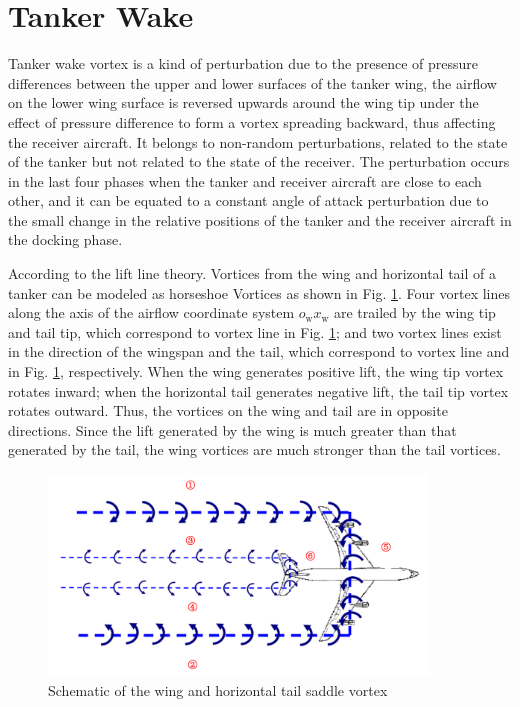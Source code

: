 \section{Tanker Wake}
Tanker wake vortex is a kind of perturbation due to the presence of pressure differences between the upper and lower surfaces of the tanker wing, the airflow on the lower wing surface is reversed upwards around the wing tip under the effect of pressure difference to form a vortex spreading backward, thus affecting the receiver aircraft. It belongs to  non-random perturbations, related to the state of the tanker but not related to the state of the receiver. The perturbation occurs in the last four phases when the tanker and receiver aircraft are close to each other, and it can be equated to a constant angle of attack perturbation due to the small change in the relative positions of the tanker and the receiver aircraft in the docking phase.

According to the lift line theory\cite{pamadi2004performance}. Vortices from the wing and horizontal tail of a tanker can be modeled as horseshoe Vortices as shown in Fig. \ref{fig2}. Four vortex lines along the axis of the airflow coordinate system $o_{\mathrm{w}}x_{\mathrm{w}}$ are trailed by the wing tip and tail tip, which correspond to vortex line  in Fig. \ref{fig2}; and two vortex lines exist in the direction of the wingspan and the tail, which correspond to vortex line  and  in Fig. \ref{fig2}, respectively. When the wing generates positive lift, the wing tip vortex rotates inward; when the horizontal tail generates negative lift, the tail tip vortex rotates outward. Thus, the vortices on the wing and tail are in opposite directions. Since the lift generated by the wing is much greater than that generated by the tail, the wing vortices are much stronger than the tail vortices.
\begin{figure}[th]
	\centering
	\includegraphics[width=0.9\textwidth]{Figures/Figs_Ch4/fig2.pdf}
	\caption{Schematic of the wing and horizontal tail saddle vortex\cite{pamadi2004performance}}\label{fig2}
\end{figure}

